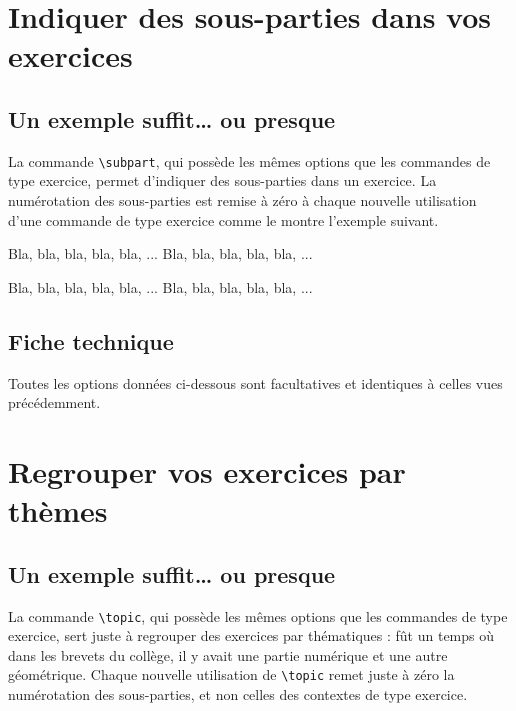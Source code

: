 \documentclass[12pt,a4paper]{article}
\makeatletter
\newcommand\resetallcnt{
		\setcounter{lyxam@topic@counter}{0}
		\setcounter{lyxam@exercise@counter}{0}
		\setcounter{lyxam@problem@counter}{0}
		\setcounter{lyxam@bonus@counter}{0}
		\setcounter{lyxam@subpart@counter}{0}
	}
\newcommand\IDmacro{\@ifstar{\@IDmacroStar}{\@IDmacroNoStar}}
\newcommand\@IDmacroNoStar[3]{%
        \texttt{%
            \textbackslash#1%
            \IfStrEq{#2}{0}{}{%
                \,\,[#2 Option%
                \IfStrEq{#2}{1}{}{s}]%
            }%
            \IfStrEq{#3}{0}{}{%
                \,\,(#3 Argument%
                \IfStrEq{#3}{1}{}{s})%
            }
           }
        \immediate\write\tempfile{macro@#1@#2@#3}%
    }
\newcommand\@IDmacroStar[2]{%
        \@IDmacroNoStar{#1}{0}{#2}%
    }
\makeatother
\begin{document}
\section{Indiquer des sous-parties dans vos exercices}

    \subsection{Un exemple suffit\dots{} ou presque}

La commande \verb+\subpart+, qui possède les mêmes options que les commandes de type exercice, permet d'indiquer des sous-parties dans un exercice. La numérotation des sous-parties est remise à zéro à chaque nouvelle utilisation d'une commande de type exercice comme le montre l'exemple suivant. 

\resetallcnt{}

\begin{tcblisting}{}
\exercise
\subpart
Bla, bla, bla, bla, bla, ...
\subpart
Bla, bla, bla, bla, bla, ...

\exercise
\subpart
Bla, bla, bla, bla, bla, ...
\subpart
Bla, bla, bla, bla, bla, ...
\end{tcblisting}


    \subsection{Fiche technique}

Toutes les options données ci-dessous sont facultatives et identiques à celles vues précédemment.

\bigskip


\IDmacro{subpart}{6}{0}

\exosoptions{}



\section{Regrouper vos exercices par thèmes}

    \subsection{Un exemple suffit\dots{} ou presque}

La commande \verb+\topic+, qui possède les mêmes options que les commandes de type exercice, sert juste à regrouper des exercices par thématiques : fût un temps où dans les brevets du collège, il y avait une partie numérique et une autre géométrique.
Chaque nouvelle utilisation de \verb+\topic+ remet juste à zéro la numérotation des sous-parties, et non celles des contextes de type exercice. 
\end{document}
